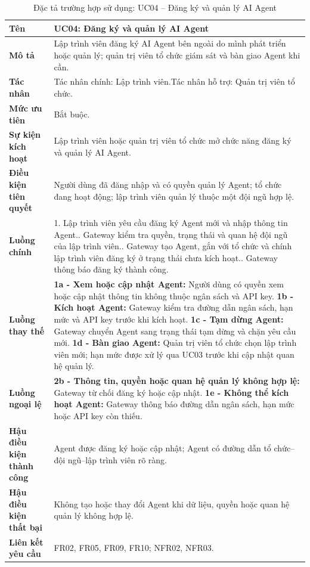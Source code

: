 \begin{longtable}{|L{4.2cm}|L{9.5cm}|}
\caption[Đặc tả UC04]{Đặc tả trường hợp sử dụng: UC04 -- Đăng ký và quản lý AI Agent} \\\hline
\textbf{Tên} & UC04: Đăng ký và quản lý AI Agent \\\hline
\textbf{Mô tả} & Lập trình viên đăng ký AI Agent bên ngoài do mình phát triển hoặc quản lý; quản trị viên tổ chức giám sát và bàn giao Agent khi cần.\\\hline
\textbf{Tác nhân} & Tác nhân chính: Lập trình viên.\newline Tác nhân hỗ trợ: Quản trị viên tổ chức.\\\hline
\textbf{Mức ưu tiên} & Bắt buộc.\\\hline
\textbf{Sự kiện kích hoạt} & Lập trình viên hoặc quản trị viên tổ chức mở chức năng đăng ký và quản lý AI Agent.\\\hline
\textbf{Điều kiện tiên quyết} & Người dùng đã đăng nhập và có quyền quản lý Agent; tổ chức đang hoạt động; lập trình viên quản lý thuộc một đội ngũ hợp lệ.\\\hline
\textbf{Luồng chính} &
1. Lập trình viên yêu cầu đăng ký Agent mới và nhập thông tin Agent.. Gateway kiểm tra quyền, trạng thái và quan hệ đội ngũ của lập trình viên.. Gateway tạo Agent, gắn với tổ chức và chính lập trình viên đăng ký ở trạng thái chưa kích hoạt.. Gateway thông báo đăng ký thành công.\\\hline
\textbf{Luồng thay thế} &
\textbf{1a - Xem hoặc cập nhật Agent:} Người dùng có quyền xem hoặc cập nhật thông tin không thuộc ngân sách và API key.\newline
\textbf{1b - Kích hoạt Agent:} Gateway kiểm tra đường dẫn ngân sách, hạn mức và API key trước khi kích hoạt.\newline
\textbf{1c - Tạm dừng Agent:} Gateway chuyển Agent sang trạng thái tạm dừng và chặn yêu cầu mới.\newline
\textbf{1d - Bàn giao Agent:} Quản trị viên tổ chức chọn lập trình viên mới; hạn mức được xử lý qua UC03 trước khi cập nhật quan hệ quản lý.\\\hline
\textbf{Luồng ngoại lệ} &
\textbf{2b - Thông tin, quyền hoặc quan hệ quản lý không hợp lệ:} Gateway từ chối đăng ký hoặc cập nhật.\newline
\textbf{1e - Không thể kích hoạt Agent:} Gateway thông báo đường dẫn ngân sách, hạn mức hoặc API key còn thiếu.\\\hline
\textbf{Hậu điều kiện thành công} & Agent được đăng ký hoặc cập nhật; Agent có đường dẫn tổ chức--đội ngũ--lập trình viên rõ ràng.\\\hline
\textbf{Hậu điều kiện thất bại} & Không tạo hoặc thay đổi Agent khi dữ liệu, quyền hoặc quan hệ quản lý không hợp lệ.\\\hline
\textbf{Liên kết yêu cầu} & FR02, FR05, FR09, FR10; NFR02, NFR03.\\\hline
\end{longtable}


